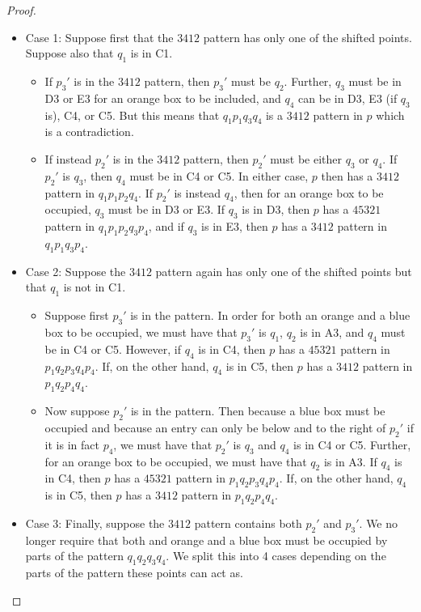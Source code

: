 \documentclass[10pt,a4paper]{amsart}
\begin{document}
\begin{proof}
    \begin{itemize}
        \item Case 1: Suppose first that the $3412$ pattern has only one of the shifted points. Suppose also that $q_1$ is in C1.
        \begin{itemize}
            \item If $p_3'$ is in the $3412$ pattern, then $p_3'$ must be $q_2$. Further, $q_3$ must be in D3 or E3 for an orange box to be included, and $q_4$ can be in D3, E3 (if $q_3$ is), C4, or C5. But this means that $q_1p_1q_3q_4$ is a $3412$ pattern in $p$ which is a contradiction. 
            \item If instead $p_2'$ is in the $3412$ pattern, then $p_2'$ must be either $q_3$ or $q_4$. If $p_2'$ is $q_3$, then $q_4$ must be in C4 or C5. In either case, $p$ then has a $3412$ pattern in $q_1p_1p_2q_4$. If $p_2'$ is instead $q_4$, then for an orange box to be occupied, $q_3$ must be in D3 or E3. If $q_3$ is in D3, then $p$ has a $45321$ pattern in $q_1p_1p_2q_3p_4$, and if $q_3$ is in E3, then $p$ has a $3412$ pattern in $q_1p_1q_3p_4$. 
        \end{itemize}
        \item Case 2: Suppose the $3412$ pattern again has only one of the shifted points but that $q_1$ is not in C1. 
        \begin{itemize}
            \item Suppose first $p_3'$ is in the pattern. In order for both an orange and a blue box to be occupied, we must have that $p_3'$ is $q_1$, $q_2$ is in A3, and $q_4$ must be in C4 or C5. However, if $q_4$ is in C4, then $p$ has a $45321$ pattern in $p_1q_2p_3q_4p_4$. If, on the other hand, $q_4$ is in C5, then $p$ has a $3412$ pattern in $p_1q_2p_4q_4$. 
            \item Now suppose $p_2'$ is in the pattern. Then because a blue box must be occupied and because an entry can only be below and to the right of $p_2'$ if it is in fact $p_4$, we must have that $p_2'$ is $q_3$ and $q_4$ is in C4 or C5. Further, for an orange box to be occupied, we must have that $q_2$ is in A3. If $q_4$ is in C4, then $p$ has a $45321$ pattern in $p_1q_2p_3q_4p_4$. If, on the other hand, $q_4$ is in C5, then $p$ has a $3412$ pattern in $p_1q_2p_4q_4$.
        \end{itemize}
        \item Case 3: Finally, suppose the $3412$ pattern contains both $p_2'$ and $p_3'$. We no longer require that both and orange and a blue box must be occupied by parts of the pattern $q_1q_2q_3q_4$. We split this into 4 cases depending on the parts of the pattern these points can act as.

\end{itemize}
\end{proof}
\end{document}
